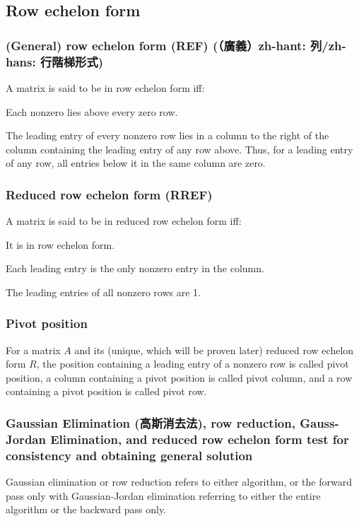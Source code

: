 \documentclass[a4paper,12pt]{report}
\begin{document}
\subsection{Row echelon form}
\subsubsection{(General) row echelon form (REF) (（廣義）zh-hant: 列/zh-hans: 行階梯形式)}
A matrix is said to be in row echelon form iff:
\ben
\item Each nonzero lies above every zero row.
\item The leading entry of every nonzero row lies in a column to the right of the column containing the leading entry of any row above.
\een
Thus, for a leading entry of any row, all entries below it in the same column are zero.
\subsubsection{Reduced row echelon form (RREF)}
A matrix is said to be in reduced row echelon form iff:
\ben
\item It is in row echelon form.
\item Each leading entry is the only nonzero entry in the column.
\item The leading entries of all nonzero rows are 1.
\een
\subsubsection{Pivot position}
For a matrix $A$ and its (unique, which will be proven later) reduced row echelon form $R$, the position containing a leading entry of a nonzero row is called pivot position, a column containing a pivot position is called pivot column, and a row containing a pivot position is called pivot row.
\subsubsection{Gaussian Elimination (高斯消去法), row reduction, Gauss-Jordan Elimination, and reduced row echelon form test for consistency and obtaining general solution}
Gaussian elimination or row reduction refers to either algorithm, or the forward pass only with Gaussian-Jordan elimination referring to either the entire algorithm or the backward pass only.
\end{document}

